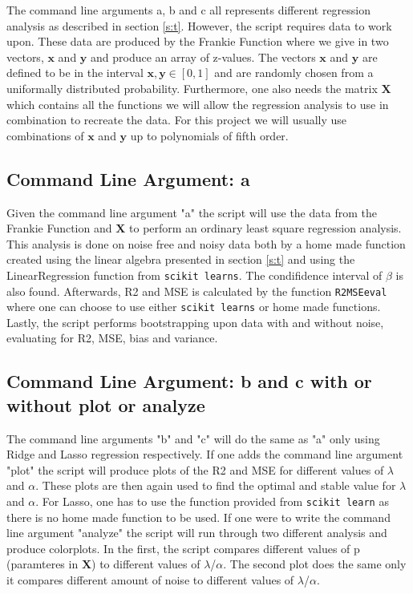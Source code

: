\documentclass[12pt]{article}
\begin{document}
The command line arguments a, b and c all represents different regression analysis as described in section \ref{s:t}. However, the script requires data to work upon. These data are produced by the Frankie Function where we give in two vectors, $\bm{x}$ and $\bm{y}$ and produce an array of z-values. The vectors  $\bm{x}$ and $\bm{y}$ are defined to be in the interval $\bm{x}, \bm{y} \in [0,1]$ and are randomly chosen from a uniformally distributed probability. Furthermore, one also needs the matrix $\bm{X}$ which contains all the functions we will allow the regression analysis to use in combination to recreate the data. For this project we will usually use combinations of $\bm{x}$ and $\bm{y}$ up to polynomials of fifth order.
\subsection{Command Line Argument: a}
Given the command line argument "a" the script will use the data from the Frankie Function and $\bm{X}$ to perform an ordinary least square regression analysis. This analysis is done on noise free and noisy data both by a home made function created using the linear algebra presented in section \ref{s:t} and using the LinearRegression function from \texttt{scikit learns}. The condifidence interval of $\beta$ is also found. Afterwards, R2 and MSE is calculated by the function \texttt{R2MSEeval} where one can choose to use either \texttt{scikit learns} or home made functions. Lastly, the script performs bootstrapping upon data with and without noise, evaluating for R2, MSE, bias and variance.
\subsection{Command Line Argument: b and c with or without plot or analyze}
The command line arguments "b" and "c" will do the same as "a" only using Ridge and Lasso regression respectively. If one adds the command line argument "plot" the script will produce plots of the R2 and MSE for different values of $\lambda$ and $\alpha$. These plots are then again used to find the optimal and stable value for $\lambda$ and $\alpha$. For Lasso, one has to use the function provided from \texttt{scikit learn} as there is no home made function to be used. If one were to write the command line argument "analyze" the script will run through two different analysis and produce colorplots. In the first, the script compares different values of p (paramteres in $\bm{X}$) to different values of $\lambda$/$\alpha$. The second plot does the same only it compares different amount of noise to different values of $\lambda$/$\alpha$.   
\end{document}
